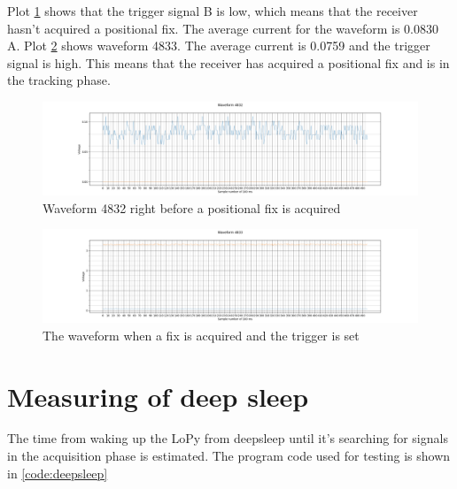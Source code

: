  Plot \ref{fig:4832} shows that the trigger signal B is low, which means that the receiver hasn't acquired a positional fix. The average current for the waveform is 0.0830 \,A. Plot \ref{fig:4833} shows waveform 4833. The average current is 0.0759 and the trigger signal is high. This means that the receiver has acquired a positional fix and is in the tracking phase. 
\begin{figure}[H]
\hspace*{-3cm}
\includegraphics[width=20 cm]{Project_Report/Images/4832.png}
\caption{Waveform 4832 right before a positional fix is acquired}
\label{fig:4832}
\end{figure}

\begin{figure}[H]
\hspace*{-3cm}
\includegraphics[width=20 cm]{Project_Report/Images/4833.png}
\caption{The waveform when a fix is acquired and the trigger is set}
\label{fig:4833}
\end{figure}




\section{Measuring of deep sleep}
The time from waking up the LoPy from deepsleep until it's searching for signals in the acquisition phase is estimated. The program code used for testing is shown in \ref{code:deepsleep}

